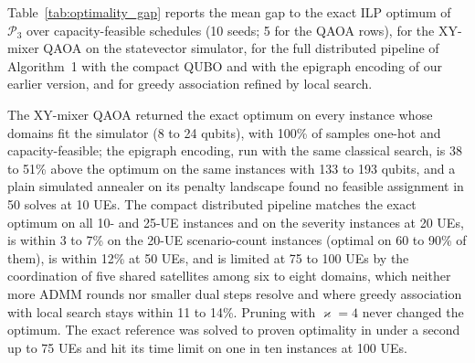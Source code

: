 Table~\ref{tab:optimality_gap} reports the mean gap to the exact ILP optimum of $\mathscr{P}_3$ over
capacity-feasible schedules (10 seeds; 5 for the QAOA rows), for the XY-mixer QAOA on the statevector simulator, for
the full distributed pipeline of Algorithm~1 with the compact QUBO and with the epigraph encoding of our earlier
version, and for greedy association refined by local search.
\begin{table}[!t]
\centering
\caption{Mean Optimality Gap (\%) Above the Exact ILP Optimum of $\mathscr{P}_3$}
\label{tab:optimality_gap}
\footnotesize
{}
\end{table}
The XY-mixer QAOA returned the exact optimum on every instance whose domains fit the simulator (8 to 24 qubits),
with 100\% of samples one-hot and capacity-feasible; the epigraph encoding, run with the same classical search, is 38
to 51\% above the optimum on the same instances with 133 to 193 qubits, and a plain simulated annealer on its penalty
landscape found no feasible assignment in 50 solves at 10 UEs. The compact distributed pipeline matches the exact optimum on all
10- and 25-UE instances and on the severity instances at 20 UEs, is within 3 to 7\% on the 20-UE scenario-count
instances (optimal on 60 to 90\% of them), is within 12\% at 50 UEs, and is limited at 75 to 100 UEs by the
coordination of five shared satellites among six to eight domains, which neither more ADMM rounds nor smaller dual
steps resolve and where greedy association with local search stays within 11 to 14\%. Pruning with $\varkappa=4$
never changed the optimum. The exact reference was solved to proven optimality in under a second up to 75 UEs and hit
its time limit on one in ten instances at 100 UEs.


